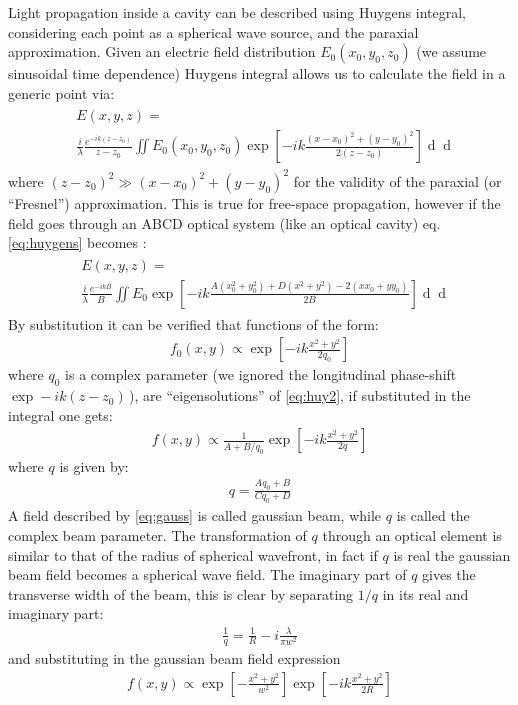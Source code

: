 Light propagation inside a cavity can be described using Huygens integral, considering each point as a spherical wave source, and the paraxial approximation. Given an electric field distribution $E_0(x_0,y_0,z_0)$ (we assume sinusoidal time dependence) Huygens integral allows us to calculate the field in a generic point via:
\begin{align}
\begin{split}
&E(x,y,z) =\\ &\frac{i}{\lambda}\frac{e^{-ik(z-z_0)}}{z-z_0}\iint E_0(x_0,y_0,z_0) \exp\left[-ik\frac{(x-x_0)^2+(y-y_0)^2}{2(z-z_0)}\right]\mathop{dx_0}\mathop{dy_0}
\end{split}
\label{eq:huygens}
\end{align}
where $(z-z_0)^2\gg(x-x_0)^2+(y-y_0)^2$ for the validity of the paraxial (or ``Fresnel'') approximation.
This is true for free-space propagation, however if the field goes through an ABCD optical system (like an optical cavity) eq. \ref{eq:huygens} becomes \parencite{svelto2010}:
\begin{align}
\begin{split}
&E(x,y,z) =\\ &\frac{i}{\lambda}\frac{e^{-ikB}}{B}\iint E_0 \exp\left[-ik\frac{A(x_0^2+y_0^2)+D(x^2+y^2)-2(xx_0+yy_0)}{2B}\right]\mathop{dx_0}\mathop{dy_0}
\end{split}
\label{eq:huy2}
\end{align}
By substitution it can be verified that functions of the form:
\begin{align}
f_0(x,y) \propto \exp\left[-ik\frac{x^2+y^2}{2q_0}\right]
\label{eq:gauss}
\end{align}
where $q_0$ is a complex parameter (we ignored the longitudinal phase-shift $\exp -ik(z-z_0)$\,), are ``eigensolutions'' of \ref{eq:huy2}, if substituted in the integral one gets:
\begin{align}
f(x,y) \propto \frac{1}{A+B/q_0} \exp\left[-ik\frac{x^2+y^2}{2q}\right]
\end{align}
where $q$ is given by:
\begin{align}
	q = \frac{Aq_0+B}{Cq_0+D}
	\label{eq:q}
\end{align}
A field described by \ref{eq:gauss} is called gaussian beam, while $q$ is called the complex beam parameter. The transformation of $q$ through an optical element is similar to that of the radius of spherical wavefront, in fact if $q$ is real the gaussian beam field becomes a spherical wave field. The imaginary part of $q$ gives the transverse width of the beam, this is clear by separating $1/q$ in its real and imaginary part:
\begin{align}
	\frac{1}{q} = \frac{1}{R} -i \frac{\lambda}{\pi w^2}
\end{align}
and substituting in the gaussian beam field expression
\begin{align}
f(x,y) \propto \exp\left[-\frac{x^2+y^2}{w^2}\right] \exp\left[-ik\frac{x^2+y^2}{2R}\right]
\end{align}

